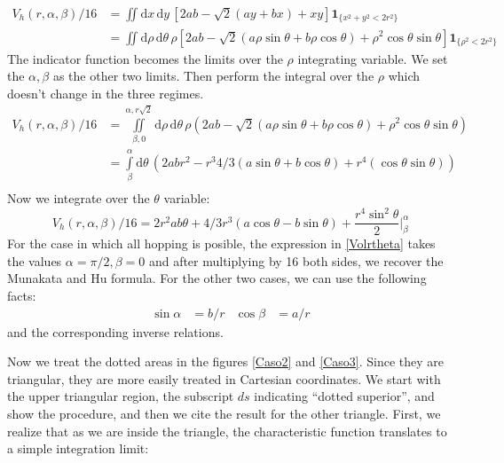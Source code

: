 \documentclass[superscriptaddress,pre,reprint,showpacs,onecolumn]{revtex4-1}
\newcommand{\rd}[1]{\mathrm{d}{#1} \,}
\newcommand{\indicatorsymbol}{\mathbf{1}}
\newcommand{\indicator}[1]{\indicatorsymbol_{ \{   #1 \} } }
\begin{document}
\begin{equation}\label{Vhatch1}
\begin{split}
V_h(r,\alpha,\beta)/16 &=
\iint \rd x \rd y \left[ 2ab-\sqrt{2}(ay+bx)+x y \right]
\indicator{x^2 + y^2 < 2r^2}\\
&=
\iint \rd \rho \rd \theta \rho 
\left[ 2ab -\sqrt{2}(a\rho\sin\theta+b\rho\cos\theta) +\rho^2 \cos\theta\sin\theta \right]
\indicator{\rho^2<2r^2 }
\end{split}
\end{equation}
The indicator function becomes the limits over the $\rho$ integrating variable.
We set the $\alpha, \beta$ as the other two limits. Then perform the
integral over the $\rho$ which doesn't change in the three regimes.
\begin{equation}
  \begin{split}
 V_h(r,\alpha,\beta)/16 &=\iint\limits_{\beta,0}^{\alpha,r\sqrt{2}} \rd \rho \rd \theta \rho (2ab
-\sqrt{2}(a\rho\sin\theta+b\rho\cos\theta)
+\rho^2 \cos\theta\sin\theta)\\
 &=\int\limits_\beta^{\alpha}  \rd \theta  
(2abr^2 - r^3 4/3 (a\sin\theta+b\cos\theta)+r^4 (\cos\theta\sin\theta))\\
\end{split}
  \end{equation}
Now we integrate over the $\theta$ variable:
\begin{equation}\label{Volrtheta}
  V_h(r,\alpha,\beta)/16 = 2r^2ab\theta
  +4/3r^3(a\cos\theta-b\sin\theta)
  +\frac{r^4 \sin^2\theta}{2} \Bigg\vert_\beta^\alpha
\end{equation}
For the case in which all hopping is posible, the expression in \eqref{Volrtheta}
takes the values $\alpha=\pi/2, \beta=0$ and after multiplying by 16 both sides,
we recover the Munakata and Hu formula. For the other two cases, we can use the following
facts:
\begin{align}
  \sin\alpha&=b/r & \cos\beta&=a/r 
\end{align}
and the corresponding inverse relations.


Now we treat the dotted areas in the figures \ref{Caso2} and \ref{Caso3}. Since they are triangular, they
are more easily treated in Cartesian coordinates. We start with the upper
triangular region, the subscript $ds$ indicating ``dotted superior'',
and show the procedure, and then we cite the result for the
other triangle.
First, we realize that as we are inside the triangle, the characteristic function
translates to a simple integration limit:
\end{document}
